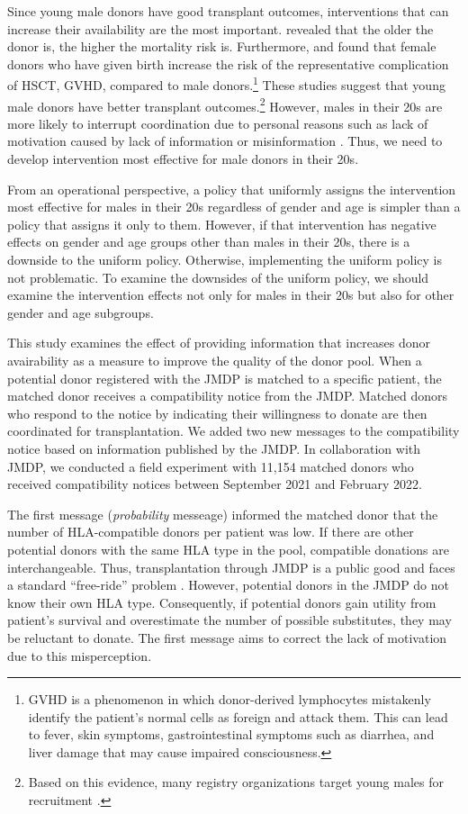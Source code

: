 \documentclass[12pt, a4paper]{article}
\begin{document}
Since young male donors have good transplant outcomes, interventions that can increase their availability are the most important. \citet{Kollman2016} revealed that the older the donor is, the higher the mortality risk is. Furthermore, \citet{Loren2006} and \citet{Kollman2016} found that female donors who have given birth increase the risk of the representative complication of HSCT, GVHD, compared to male donors.\footnote{GVHD is a phenomenon in which donor-derived lymphocytes mistakenly identify the patient's normal cells as foreign and attack them. This can lead to fever, skin symptoms, gastrointestinal symptoms such as diarrhea, and liver damage that may cause impaired consciousness.} These studies suggest that young male donors have better transplant outcomes.\footnote{Based on this evidence, many registry organizations target young males for recruitment \citep{Fingrut2018}.} However, males in their 20s are more likely to interrupt coordination due to personal reasons such as lack of motivation caused by lack of information or misinformation \citep{Hirakawa2018, Kurosawa2022}. Thus, we need to develop intervention most effective for male donors in their 20s.

From an operational perspective, a policy that uniformly assigns the intervention most effective for males in their 20s regardless of gender and age is simpler than a policy that assigns it only to them. However, if that intervention has negative effects on gender and age groups other than males in their 20s, there is a downside to the uniform policy. Otherwise, implementing the uniform policy is not problematic. To examine the downsides of the uniform policy, we should examine the intervention effects not only for males in their 20s but also for other gender and age subgroups.

This study examines the effect of providing information that increases donor avairability as a measure to improve the quality of the donor pool. When a potential donor registered with the JMDP is matched to a specific patient, the matched donor receives a compatibility notice from the JMDP. Matched donors who respond to the notice by indicating their willingness to donate are then coordinated for transplantation. We added two new messages to the compatibility notice based on information published by the JMDP. In collaboration with JMDP, we conducted a field experiment with 11,154 matched donors who received compatibility notices between September 2021 and February 2022.

The first message (\emph{probability} messeage) informed the matched donor that the number of HLA-compatible donors per patient was low. If there are other potential donors with the same HLA type in the pool, compatible donations are interchangeable. Thus, transplantation through JMDP is a public good and faces a standard ``free-ride'' problem \citep{Bergstrom2009}. However, potential donors in the JMDP do not know their own HLA type. Consequently, if potential donors gain utility from patient's survival and overestimate the number of possible substitutes, they may be reluctant to donate. The first message aims to correct the lack of motivation due to this misperception.
\end{document}
